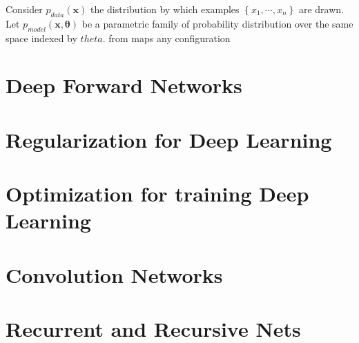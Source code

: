 Consider $p_{data}(\bm{x})$ the distribution by which examples $\left\{x_{1},\cdots,
x_{n}\right\}$ are drawn.
Let $p_{model}(\bm{x}, \bm{\theta})$ be a parametric family of probability distribution 
over the same space indexed by $theta$.
from 
maps any configuration
\section{Deep Forward Networks}

\section{Regularization for Deep Learning}

\section{Optimization for training Deep Learning}

\section{Convolution Networks}

\section{Recurrent and Recursive Nets}

